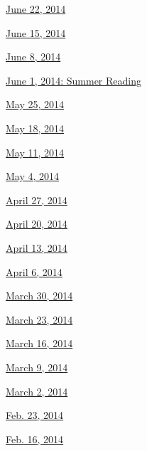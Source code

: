 \href{http://www.nytimes3xbfgragh.onion/indexes/2014/06/22/books/review/index.html}{June
22, 2014}

\href{http://www.nytimes3xbfgragh.onion/indexes/2014/06/15/books/review/index.html}{June
15, 2014}

\href{http://www.nytimes3xbfgragh.onion/indexes/2014/06/08/books/review/index.html}{June
8, 2014}

\href{http://www.nytimes3xbfgragh.onion/indexes/2014/06/01/books/review/index.html}{June
1, 2014: Summer Reading}

\href{http://www.nytimes3xbfgragh.onion/indexes/2014/05/25/books/review/index.html}{May
25, 2014}

\href{http://www.nytimes3xbfgragh.onion/indexes/2014/05/18/books/review/index.html}{May
18, 2014}

\href{http://www.nytimes3xbfgragh.onion/indexes/2014/05/11/books/review/index.html}{May
11, 2014}

\href{http://www.nytimes3xbfgragh.onion/indexes/2014/05/04/books/review/index.html}{May
4, 2014}

\href{http://www.nytimes3xbfgragh.onion/indexes/2014/04/27/books/review/index.html}{April
27, 2014}

\href{http://www.nytimes3xbfgragh.onion/indexes/2014/04/20/books/review/index.html}{April
20, 2014}

\href{http://www.nytimes3xbfgragh.onion/indexes/2014/04/13/books/review/index.html}{April
13, 2014}

\href{http://www.nytimes3xbfgragh.onion/indexes/2014/04/06/books/review/index.html}{April
6, 2014}

\href{http://www.nytimes3xbfgragh.onion/indexes/2014/03/30/books/review/index.html}{March
30, 2014}

\href{http://www.nytimes3xbfgragh.onion/indexes/2014/03/23/books/review/index.html}{March
23, 2014}

\href{http://www.nytimes3xbfgragh.onion/indexes/2014/03/16/books/review/index.html}{March
16, 2014}

\href{http://www.nytimes3xbfgragh.onion/indexes/2014/03/09/books/review/index.html}{March
9, 2014}

\href{http://www.nytimes3xbfgragh.onion/indexes/2014/03/02/books/review/index.html}{March
2, 2014}

\href{http://www.nytimes3xbfgragh.onion/indexes/2014/02/23/books/review/index.html}{Feb.
23, 2014}

\href{http://www.nytimes3xbfgragh.onion/indexes/2014/02/16/books/review/index.html}{Feb.
16, 2014}


